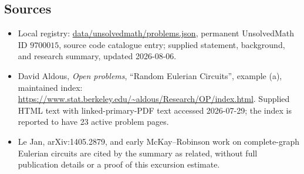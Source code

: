 \documentclass[11pt]{article}
\begin{document}
\subsection{Sources}
\begin{itemize}
\item Local registry: \url{data/unsolvedmath/problems.json}, permanent UnsolvedMath ID \(9700015\), source code catalogue entry; supplied statement, background, and research summary, updated 2026-08-06.
\item David Aldous, \emph{Open problems}, ``Random Eulerian Circuits'', example (a), maintained index: \url{https://www.stat.berkeley.edu/~aldous/Research/OP/index.html}. Supplied HTML text with linked-primary-PDF text accessed 2026-07-29; the index is reported to have 23 active problem pages.
\item Le Jan, arXiv:1405.2879, and early McKay--Robinson work on complete-graph Eulerian circuits are cited by the summary as related, without full publication details or a proof of this excursion estimate.
\end{itemize}
\end{document}
